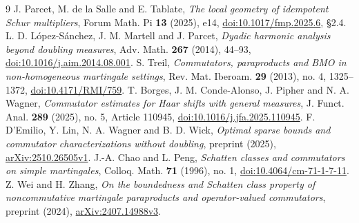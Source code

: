 \documentclass[11pt]{amsart}
\begin{document}
\begin{thebibliography}{9}
J. Parcet, M. de la Salle and E. Tablate,
\emph{The local geometry of idempotent Schur multipliers},
Forum Math. Pi \textbf{13} (2025), e14,
\href{https://doi.org/10.1017/fmp.2025.6}{doi:10.1017/fmp.2025.6},
\S 2.4.
L. D. L\'opez-S\'anchez, J. M. Martell and J. Parcet,
\emph{Dyadic harmonic analysis beyond doubling measures},
Adv. Math. \textbf{267} (2014), 44--93,
\href{https://doi.org/10.1016/j.aim.2014.08.001}{doi:10.1016/j.aim.2014.08.001}.
S. Treil,
\emph{Commutators, paraproducts and BMO in non-homogeneous martingale settings},
Rev. Mat. Iberoam. \textbf{29} (2013), no. 4, 1325--1372,
\href{https://doi.org/10.4171/RMI/759}{doi:10.4171/RMI/759}.
T. Borges, J. M. Conde-Alonso, J. Pipher and N. A. Wagner,
\emph{Commutator estimates for Haar shifts with general measures},
J. Funct. Anal. \textbf{289} (2025), no. 5, Article 110945,
\href{https://doi.org/10.1016/j.jfa.2025.110945}{doi:10.1016/j.jfa.2025.110945}.
F. D'Emilio, Y. Lin, N. A. Wagner and B. D. Wick,
\emph{Optimal sparse bounds and commutator characterizations without doubling},
preprint (2025),
\href{https://arxiv.org/abs/2510.26505v1}{arXiv:2510.26505v1}.
J.-A. Chao and L. Peng,
\emph{Schatten classes and commutators on simple martingales},
Colloq. Math. \textbf{71} (1996), no. 1,
\href{https://doi.org/10.4064/cm-71-1-7-11}{doi:10.4064/cm-71-1-7-11}.
Z. Wei and H. Zhang,
\emph{On the boundedness and Schatten class property of noncommutative
martingale paraproducts and operator-valued commutators},
preprint (2024),
\href{https://arxiv.org/abs/2407.14988v3}{arXiv:2407.14988v3}.
\end{thebibliography}
\end{document}
